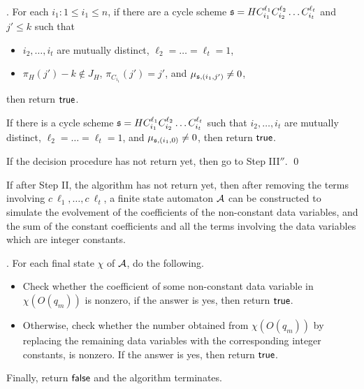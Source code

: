 \begin{appendix}
\medskip

. For each $i_1: 1 \le i_1 \le n$, if there are a cycle scheme ${\mathfrak{s} }=HC_{i_1}^{\ell_1} C_{i_2}^{\ell_2} \dots C_{i_t}^{\ell_t}$  and $j' \le k$ such that 
\begin{itemize}
\item $i_2,\dots,i_t$ are mutually distinct, $\ell_2 = \dots = \ell_t = 1$, 
%
\item $\pi_H(j')-k \not \in J_H$, $\pi_{C_{i_1}}(j')=j'$, and $\mu_{{\mathfrak{s} },(i_1,j')} \neq 0$, 
\end{itemize}
then return $\mathsf{true}$.

If there is a cycle scheme ${\mathfrak{s} }=HC_{i_1}^{\ell_1} C_{i_2}^{\ell_2} \dots C_{i_t}^{\ell_t}$ such that 
$i_2,\dots,i_t$ are mutually distinct, $\ell_2 = \dots = \ell_t = 1$, 
%
and $\mu_{{\mathfrak{s} },(i_1,0)} \neq 0$, 
%
then return $\mathsf{true}$. 

If the decision procedure has not return yet, then go to Step III$''$. \qed

\medskip

If after Step II, the algorithm has not return yet, then after removing the terms involving $c\ \ell_1,\dots, c\ \ell_t$, a finite state automaton ${\mathcal{A} }$ can be constructed to simulate the evolvement of the coefficients of the non-constant data variables, and the sum of the constant coefficients and all the terms involving the data variables which are integer constants. 

\medskip



. For each final state $\chi$ of ${\mathcal{A} }$, do the following.
\begin{itemize}
\item Check whether the coefficient of some non-constant data variable in $\chi(O(q_m))$ is nonzero, if the answer is yes, then return $\mathsf{true}$.
%
\item Otherwise, check whether the number obtained from $\chi(O(q_m))$ by replacing the remaining data variables with the corresponding integer constants, is nonzero. If the answer is yes, then return $\mathsf{true}$. 
\end{itemize}
Finally, return $\mathsf{false}$ and the algorithm terminates.

\end{appendix}




